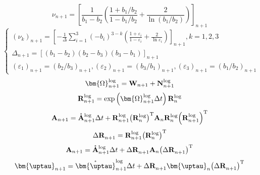 \begin{equation}
{\nu _{n + 1}} = {\left[ {\frac{1}{{{b_1} - {b_2}}}\left( {\frac{{1 + {b_1}/{b_2}}}{{1 - {b_1}/{b_2}}} + \frac{2}{{\ln \left( {{b_1}/{b_2}} \right)}}} \right)} \right]_{n + 1}}
\end{equation}
\begin{equation}
\left\{ {\begin{array}{*{20}{l}}
{{{\left( {{\nu _k}} \right)}_{n + 1}} = {{\left[ { - \frac{1}{\Delta }\sum\limits_{i = 1}^3 {{{\left( { - {b_i}} \right)}^{3 - k}}\left( {\frac{{1 + {\varepsilon _i}}}{{1 - {\varepsilon _i}}} + \frac{2}{{\ln {\varepsilon _i}}}} \right)} } \right]}_{n + 1}},k = 1,2,3}\\
{{\Delta _{n + 1}} = {{\left[ {\left( {{b_1} - {b_2}} \right)\left( {{b_2} - {b_3}} \right)\left( {{b_3} - {b_1}} \right)} \right]}_{n + 1}}}\\
{{{\left( {{\varepsilon _1}} \right)}_{n + 1}} = {{\left( {{b_2}/{b_3}} \right)}_{n + 1}},{{\left( {{\varepsilon _2}} \right)}_{n + 1}} = {{\left( {{b_3}/{b_1}} \right)}_{n + 1}},{{\left( {{\varepsilon _3}} \right)}_{n + 1}} = {{\left( {{b_1}/{b_2}} \right)}_{n + 1}}}
\end{array}} \right.
\end{equation}
\begin{equation}
{\bm{\Omega}}_{n + 1}^{\log } = {{\bf{W}}_{n + 1}} + {\bf{N}}_{n + 1}^{\log }
\end{equation}
\begin{equation}
{\bf{R}}_{n + 1}^{\log } = \exp \left( {{\bm{\Omega}}_{n + 1}^{\log }\Delta t} \right){\bf{R}}_n^{\log }
\end{equation}
\begin{equation}
{{\bf{A}}_{n + 1}} = \mathring {\mathbf{A}}_{n + 1}^{\log }\Delta t + {\bf{R}}_{n + 1}^{\log }{\left( {{\bf{R}}_n^{\log }} \right)^{\rm{T}}}{{\bf{A}}_n}{\bf{R}}_n^{\log }{\left( {{\bf{R}}_{n + 1}^{\log }} \right)^{\rm{T}}}
\end{equation}
\begin{equation}
\Delta {\bf{R}}_{n + 1}^{} = {\bf{R}}_{n + 1}^{\log }{\left( {{\bf{R}}_n^{\log }} \right)^{\rm{T}}}
\end{equation}
\begin{equation}
{{\bf{A}}_{n + 1}} = \mathring {\mathbf{A}}_{n + 1}^{\log } \Delta t + \Delta {\bf{R}}_{n + 1}^{}{{\bf{A}}_n}{\left( {\Delta {\bf{R}}_{n + 1}^{}} \right)^{\rm{T}}}
\end{equation}
\begin{equation}
{{\bm{\uptau }}_{n + 1}} = \mathring {\bm{\uptau}}_{n + 1}^{\log }\Delta t + \Delta {\mathbf{R}}_{n + 1}^{}{{\bm{\uptau }}_n}{\left( {\Delta {\mathbf{R}}_{n + 1}^{}} \right)^{\rm{T}}}
\end{equation}
